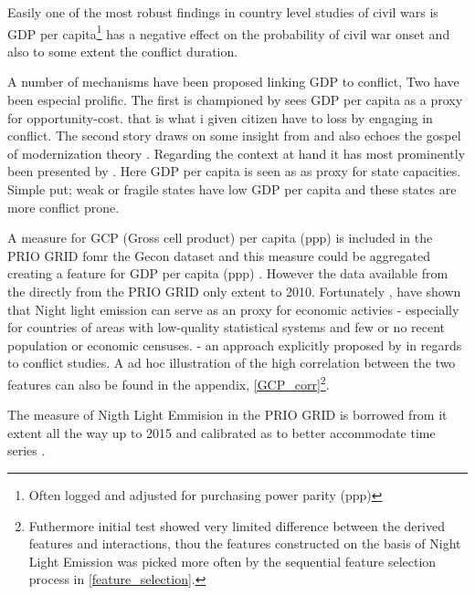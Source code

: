 \documentclass[a4paper]{article}
\begin{document}
 Easily one of the most robust findings in country level studies of civil wars is GDP per capita\footnote{Often logged and adjusted for purchasing power parity (ppp)} has a negative effect on the probability of civil war onset \citep{Collier_Hoeffler_1998, Fearon_Laitin_2003, Collier_Hoeffler_2004, Hegre_Sambanis_2006, Blattman_Miguel_2010} and also to some extent the conflict duration\citep{Fearon_2004, Hegre_Oestby_Raleigh_2009}.\par
 
 A number of mechanisms have been proposed linking GDP to conflict, Two have been especial prolific. The first is championed by \cite{Collier_Hoeffler_1998, Collier_Hoeffler_2004} sees GDP per capita as a proxy for opportunity-cost. that is what i given citizen have to loss by engaging in conflict. The second story draws on some insight from \cite{Skocpol_1979} and also echoes the gospel of modernization theory \citep{Lipset_1959}. Regarding the context at hand it has most prominently been presented by \cite{Fearon_Laitin_2003}. Here GDP per capita is seen as as proxy for state capacities. Simple put; weak or fragile states have low GDP per capita and these states are more conflict prone\citep[88]{Fearon_Laitin_2003}.\par
 
 A measure for GCP (Gross cell product) per capita (ppp) is included in the PRIO GRID fomr the Gecon dataset \citep{Nordhaus_2006} and this measure could be aggregated creating a feature for GDP per capita (ppp) \citep{prio_code_2015}. However the data available from the directly from the PRIO GRID only extent to 2010. Fortunately \cite{Elvidge_2009}, \cite{Chen_Nordhuas_2011} have shown that Night light emission can serve as an proxy for economic activies - especially for countries of areas with low-quality statistical systems and few or no recent population or economic censuses. \citep{Chen_Nordhuas_2011} - an approach explicitly proposed by \cite[p. 101]{Cederman_Gleditsch_Buhaug_2013} in regards to conflict studies. A ad hoc illustration of the high correlation between the two features can also be found in the appendix, \autoref{GCP_corr}\footnote{Futhermore initial test showed very limited difference between the derived features and interactions, thou the features constructed on the basis of Night Light Emission was picked more often by the sequential feature selection process in \autoref{feature_selection}.}.\par
 
 The measure of Nigth Light Emmision in the PRIO GRID is borrowed from \cite{Elvidge_2014}it extent all the way up to 2015 and calibrated as to better accommodate time series \cite{prio_code_2015}.\par %
 
\end{document}
